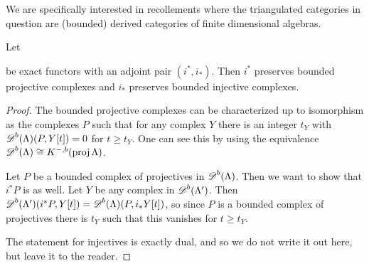 We are specifically interested in recollements where the triangulated categories in question are (bounded) derived categories of finite dimensional algebras.

\begin{lemma} \label{lem:adjoint_preserves_bounded_proj/inj}
	Let  be exact functors with an adjoint pair $(i^*,i_*)$. Then $i^*$ preserves bounded projective complexes and $i_*$ preserves bounded injective complexes.
	\begin{proof}
		The bounded projective complexes can be characterized up to isomorphism as the complexes $P$ such that for any complex $Y$ there is an integer $t_Y$ with $\operatorname{\mathscr{D}}^b(\Lambda) (P, Y[t])=0$ for $t\geq t_Y$. One can see this by using the equivalence $\operatorname{\mathscr{D}}^b(\Lambda) \cong K^{-,b}(\operatorname{proj}\Lambda)$.
		
		Let $P$ be a bounded complex of projectives in $\operatorname{\mathscr{D}}^b(\Lambda)$. Then we want to show that $i^*P$ is as well. Let $Y$ be any complex in $\operatorname{\mathscr{D}}^b(\Lambda')$. Then $\operatorname{\mathscr{D}}^b(\Lambda')(i^*P, Y[t]) = \operatorname{\mathscr{D}}^b(\Lambda)(P, i_*Y[t])$, so since $P$ is a bounded complex of projectives there is $t_Y$ such that this vanishes for $t \geq t_Y$. 
		
		The statement for injectives is exactly dual, and so we do not write it out here, but leave it to the reader.
	\end{proof}
\end{lemma}

